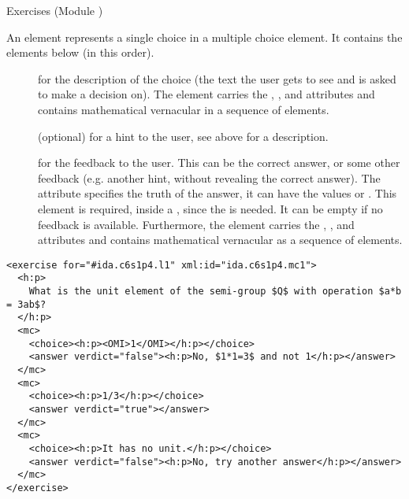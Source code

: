 \begin{module}[id=quiz]
\begin{omgroup}[id=quiz,short=Exercises]{Exercises (Module {})}
\begin{definition}[id=mc.def] 
  An {} element represents a single choice in a multiple choice element. It
  contains the elements below (in this order).
\begin{description}
\item[] for the description of the choice (the text the user gets to see
  and is asked to make a decision on). The {} element carries the
  {}, {}, and
  {} attributes and contains mathematical vernacular in a sequence
  of  elements.
\item[] (optional) for a hint to the user, see above for a description.
\item[] for the feedback to the user. This can be the correct answer, or
  some other feedback (e.g. another hint, without revealing the correct answer).  The
   attribute specifies the truth of the answer, it can have
  the values  or . This
  element is required, inside a , since the  is
  needed. It can be empty if no feedback is available. Furthermore, the {}
  element carries the {}, {}, and
  {} attributes and contains mathematical vernacular as a sequence
  of  elements.
\end{description}
\end{definition}

\begin{lstlisting}[label=lst:exercise,mathescape,
  caption={A Multiple-Choice Exercise in \omdoc},
  index={exercise,mc,choice,answer}]
<exercise for="#ida.c6s1p4.l1" xml:id="ida.c6s1p4.mc1">
  <h:p>
    What is the unit element of the semi-group $Q$ with operation $a*b = 3ab$?
  </h:p> 
  <mc>
    <choice><h:p><OMI>1</OMI></h:p></choice>
    <answer verdict="false"><h:p>No, $1*1=3$ and not 1</h:p></answer>
  </mc>
  <mc>
    <choice><h:p>1/3</h:p></choice>
    <answer verdict="true"></answer>
  </mc>
  <mc>
    <choice><h:p>It has no unit.</h:p></choice>
    <answer verdict="false"><h:p>No, try another answer</h:p></answer>
  </mc>
</exercise>
\end{lstlisting}
\end{omgroup}
\end{module}

